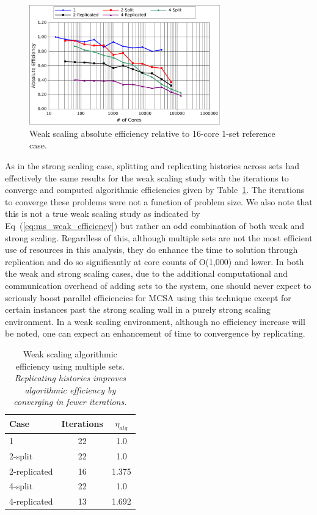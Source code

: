 \documentclass{snamc2013}
\begin{document}
\begin{figure}[h!]
  \begin{center}
    \includegraphics[width=3.25in]{titan_weak_ms_eff.pdf}
  \end{center}
  \caption{Weak scaling absolute efficiency relative to 16-core 1-set
    reference case.}
  \label{fig:titan_weak_ms_eff}
\end{figure}

As in the strong scaling case, splitting and replicating histories
across sets had effectively the same results for the weak scaling
study with the iterations to converge and computed algorithmic
efficiencies given by Table~\ref{tab:ms_weak_alg_eff}. The iterations
to converge these problems were not a function of problem size.  We
also note that this is not a true weak scaling study as indicated by
Eq~(\ref{eq:ms_weak_efficiency}) but rather an odd combination of both
weak and strong scaling. Regardless of this, although multiple sets
are not the most efficient use of resources in this analysis, they do
enhance the time to solution through replication and do so
significantly at core counts of O(1,000) and lower. In both the weak
and strong scaling cases, due to the additional computational and
communication overhead of adding sets to the system, one should never
expect to seriously boost parallel efficiencies for MCSA using this
technique except for certain instances past the strong scaling wall in
a purely strong scaling environment. In a weak scaling environment,
although no efficiency increase will be noted, one can expect an
enhancement of time to convergence by replicating.

\begin{table}[h!]
  \begin{center}
    \begin{tabular}{lcc}\hline\hline
      \multicolumn{1}{l}{Case}& 
      \multicolumn{1}{c}{Iterations}&
      \multicolumn{1}{c}{$\eta_{alg}$} \\\hline
      1 & 22 & 1.0 \\
      2-split & 22 & 1.0 \\
      2-replicated & 16 & 1.375 \\
      4-split & 22 & 1.0 \\
      4-replicated & 13 & 1.692 \\
      \hline\hline
    \end{tabular}
  \end{center}
  \caption{Weak scaling algorithmic efficiency using multiple
    sets. \textit{Replicating histories improves algorithmic
      efficiency by converging in fewer iterations.}}
  \label{tab:ms_weak_alg_eff}
\end{table}
\end{document}
